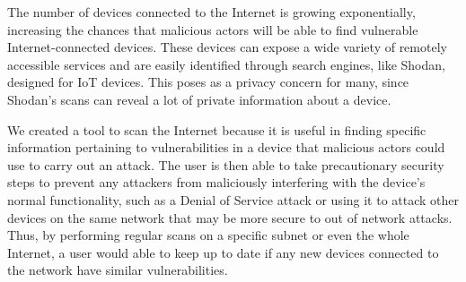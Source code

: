 

The number of devices connected to the Internet is growing exponentially, increasing
the chances that malicious actors will be able to find vulnerable Internet-connected devices.
These devices can expose a wide variety of remotely accessible services
and are easily identified through search engines, like Shodan, designed for IoT devices.
This poses as a privacy concern for many, since Shodan's scans can reveal a lot of
private information about a device.

We created a tool to scan the Internet
because it is useful in finding specific information pertaining to vulnerabilities in a device
that malicious actors could use to carry out an attack. The user is then able to 
take precautionary security steps to prevent any attackers from maliciously interfering
with the device's normal functionality, such as a Denial of Service attack or using it to
attack other devices on the same network that may be more secure to out of network attacks.
Thus, by performing regular scans on a specific subnet or even the whole Internet, a user
would able to keep up to date if any new devices connected to the network have similar
vulnerabilities.
